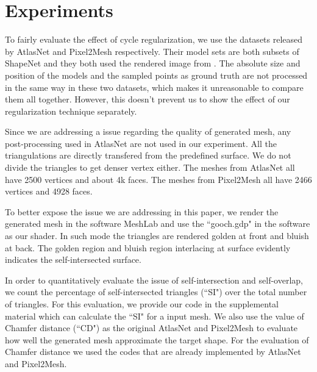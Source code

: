 \section{Experiments}
 To fairly evaluate the effect of cycle regularization, we use the datasets released by AtlasNet and Pixel2Mesh respectively. Their model sets are both subsets of ShapeNet\cite{shapenetdata} and they both used the rendered image from \cite{3DR2N2}. The absolute size and position of the models and the sampled points as ground truth are not processed in the same way in these two datasets, which makes it unreasonable to compare them all together. However, this doesn't prevent us to show the effect of our regularization technique separately.

 Since we are addressing a issue regarding the quality of generated mesh, any post-processing used in AtlasNet\cite{atlasnet} are not used in our experiment. All the triangulations are directly transfered from the predefined surface. We do not divide the triangles to get denser vertex either. The meshes from AtlasNet all have 2500 vertices and about 4k faces. The meshes from Pixel2Mesh all have 2466 vertices and 4928 faces.

To better expose the issue we are addressing in this paper, we render the generated mesh in the software MeshLab and use the ``gooch.gdp" in the software as our shader. In such mode the triangles are rendered golden at front and bluish at back. The golden region and bluish region interlacing at surface evidently indicates the self-intersected surface.

In order to quantitatively evaluate the issue of self-intersection and self-overlap, we count the percentage of self-intersected triangles (``SI") over the total number of triangles. For this evaluation, we provide our code in the supplemental material which can calculate the ``SI" for a input mesh.  
We also use the value of Chamfer distance (``CD") as the original AtlasNet and Pixel2Mesh to evaluate how well the generated mesh approximate the target shape. For the evaluation of Chamfer distance we used the codes that are already implemented by AtlasNet\cite{atlasnet} and Pixel2Mesh\cite{pixel2mesh}.

